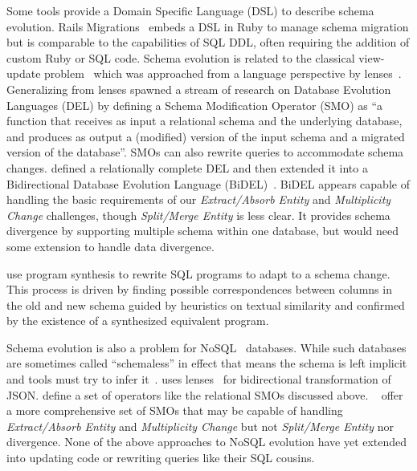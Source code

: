\documentclass[english,submission]{programming}
\begin{document}
Some tools provide a Domain Specific Language (DSL) to describe schema evolution. Rails Migrations~\cite{RailsMigrations} embeds a DSL in Ruby to manage schema migration but is comparable to the capabilities of SQL DDL, often requiring the addition of custom Ruby or SQL code. Schema evolution is related to the classical view-update problem~\cite{Bancilhon81} which was approached from a language perspective by lenses~\cite{Foster2007}. Generalizing from lenses \citet{curino08} spawned a stream of research on Database Evolution Languages (DEL) by defining a Schema Modification Operator (SMO) as ``a function that receives as input a relational schema and the underlying database, and produces as output a (modified) version of the input schema and a migrated version of the database''. SMOs can also rewrite queries to accommodate schema changes. \citet{herrmann15} defined a relationally complete DEL and then extended it into a Bidirectional Database Evolution Language (BiDEL)~\cite{herrmann17}. BiDEL appears capable of handling the basic requirements of our \emph{Extract/Absorb Entity} and \emph{Multiplicity Change} challenges, though \emph{Split/Merge Entity} is less clear. It provides schema divergence by supporting multiple schema within one database, but would need some extension to handle data divergence.

\citet{wang19} use program synthesis to rewrite SQL programs to adapt to a schema change. This process is driven by finding possible correspondences between columns in the old and new schema guided by heuristics on textual similarity and confirmed by the existence of a synthesized equivalent program.

Schema evolution is also a problem for NoSQL~\cite{sadalage12} databases. While such databases are sometimes called ``schemaless'' in effect that means the schema is left implicit and tools must try to infer it~\cite{storl20, storl22}. \citet{Cambria} uses lenses~\cite{Foster2007} for bidirectional transformation of JSON. \citet{scherzinger13} define a set of operators like the relational SMOs discussed above. \citeauthor*{chillon21}~\cite{chillon21, chillon22} offer a more comprehensive set of SMOs that may be capable of handling \textit{Extract/Absorb Entity} and \emph{Multiplicity Change} but not \emph{Split/Merge Entity} nor divergence. None of the above approaches to NoSQL evolution have yet extended into updating code or rewriting queries like their SQL cousins.
\end{document}
